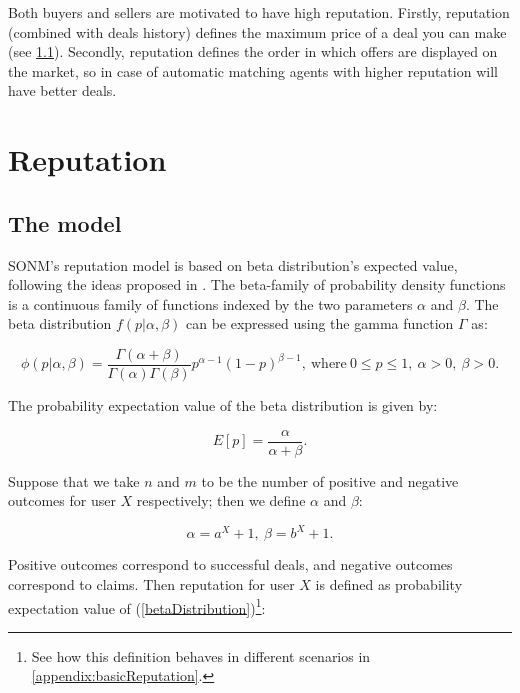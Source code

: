 \documentclass[11pt]{article}
\begin{document}
Both buyers and sellers are motivated to have high reputation. Firstly, reputation (combined with deals history) defines the maximum price of a deal you can make (see \ref{reputation:theModel}). Secondly, reputation defines the order in which offers are displayed on the market, so in case of automatic matching agents with higher reputation will have better deals.

\section{Reputation} \label{reputation}

\subsection{The model} \label{reputation:theModel}

SONM's reputation model is based on beta distribution's expected value, following the ideas proposed in \cite{josang2002beta}. The beta-family of probability density functions is a continuous family of functions indexed by the two parameters $ \alpha $ and $ \beta $. The beta distribution $ f(p | \alpha, \beta) $ can be expressed using the gamma function $ \Gamma $ as:

\begin{equation} \label{betaDistribution}
\phi(p | \alpha, \beta) = \frac{\Gamma(\alpha + \beta)}{\Gamma(\alpha) \Gamma(\beta)} p^{\alpha - 1} (1 - p)^{\beta - 1},\ \text{where}\ 0 \leq p \leq 1,\ \alpha > 0,\ \beta > 0.
\end{equation}

The probability expectation value of the beta distribution is given by:

\begin{equation}
E[p] = \frac{\alpha}{\alpha + \beta}.
\end{equation}

Suppose that we take $ n $ and $ m $ to be the number of positive and negative outcomes for user $ X $ respectively; then we define $ \alpha $ and $ \beta $:

\begin{equation}
\alpha = a^{X} + 1,\ \beta = b^{X} + 1.
\end{equation}

Positive outcomes correspond to successful deals, and negative outcomes correspond to claims. Then  reputation for user $ X $ is defined as probability expectation value of (\ref{betaDistribution})\footnote{See how this definition behaves in different scenarios in \ref{appendix:basicReputation}.}:
\end{document}
